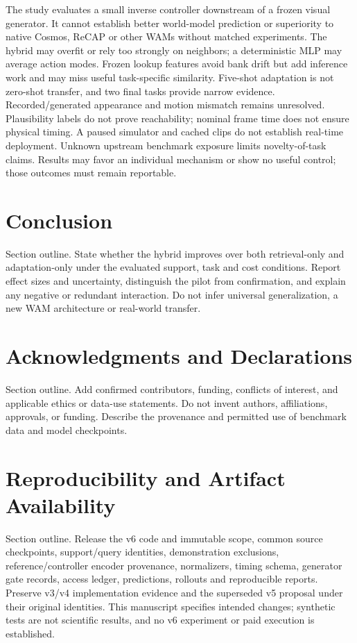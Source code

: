 \documentclass[11pt,a4paper]{article}
\begin{document}
The study evaluates a small inverse controller downstream of a frozen visual generator. It cannot establish better world-model prediction or superiority to native Cosmos, ReCAP or other WAMs without matched experiments. The hybrid may overfit or rely too strongly on neighbors; a deterministic MLP may average action modes. Frozen lookup features avoid bank drift but add inference work and may miss useful task-specific similarity. Five-shot adaptation is not zero-shot transfer, and two final tasks provide narrow evidence. Recorded/generated appearance and motion mismatch remains unresolved. Plausibility labels do not prove reachability; nominal frame time does not ensure physical timing. A paused simulator and cached clips do not establish real-time deployment. Unknown upstream benchmark exposure limits novelty-of-task claims. Results may favor an individual mechanism or show no useful control; those outcomes must remain reportable.

\section{Conclusion}

Section outline. State whether the hybrid improves over both retrieval-only and adaptation-only under the evaluated support, task and cost conditions. Report effect sizes and uncertainty, distinguish the pilot from confirmation, and explain any negative or redundant interaction. Do not infer universal generalization, a new WAM architecture or real-world transfer.

\section*{Acknowledgments and Declarations}

Section outline. Add confirmed contributors, funding, conflicts of interest, and applicable ethics or data-use statements. Do not invent authors, affiliations, approvals, or funding. Describe the provenance and permitted use of benchmark data and model checkpoints.

\section*{Reproducibility and Artifact Availability}

Section outline. Release the v6 code and immutable scope, common source checkpoints, support/query identities, demonstration exclusions, reference/controller encoder provenance, normalizers, timing schema, generator gate records, access ledger, predictions, rollouts and reproducible reports. Preserve v3/v4 implementation evidence and the superseded v5 proposal under their original identities. This manuscript specifies intended changes; synthetic tests are not scientific results, and no v6 experiment or paid execution is established.
\end{document}
